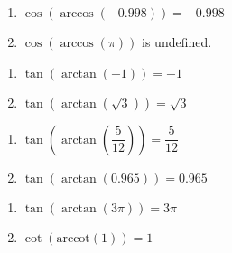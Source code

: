 \begin{multicols}{2}

\begin{enumerate}

\setcounter{enumi}{\value{HW}}

\item $\cos\left(\arccos\left(-0.998\right)\right) = -0.998$
\item $\cos\left(\arccos\left(\pi \right)\right)$ is undefined.

\setcounter{HW}{\value{enumi}}

\end{enumerate}

\end{multicols}

\begin{multicols}{2}

\begin{enumerate}

\setcounter{enumi}{\value{HW}}

\item $\tan\left(\arctan\left(-1\right)\right) = -1$
\item $\tan\left(\arctan\left(\sqrt{3}\right)\right) = \sqrt{3}$

\setcounter{HW}{\value{enumi}}

\end{enumerate}

\end{multicols}

\begin{multicols}{2}

\begin{enumerate}

\setcounter{enumi}{\value{HW}}

\item $\tan\left(\arctan\left(\dfrac{5}{12}\right)\right) = \dfrac{5}{12}$
\item $\tan\left(\arctan\left(0.965\right)\right) = 0.965$ 

\setcounter{HW}{\value{enumi}}

\end{enumerate}

\end{multicols}

\begin{multicols}{2}

\begin{enumerate}

\setcounter{enumi}{\value{HW}}

\item $\tan\left(\arctan\left( 3\pi \right)\right) = 3\pi$
\item $\cot\left(\text{arccot}\left(1\right)\right) = 1$

\setcounter{HW}{\value{enumi}}

\end{enumerate}

\end{multicols}

